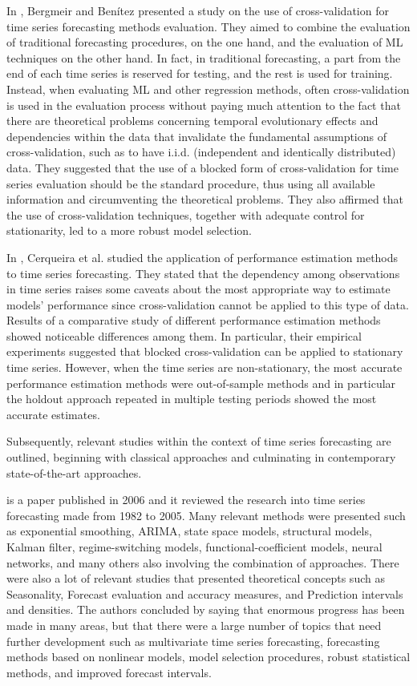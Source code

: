 In \cite{BERGMEIR2012192}, Bergmeir and Benítez presented a study on the use of cross-validation for time series forecasting methods evaluation.
They aimed to combine the evaluation of traditional forecasting procedures, on the one hand, and the evaluation of ML techniques on the other hand.
In fact, in traditional forecasting, a part from the end of each time series is reserved for testing, and the rest is used for training.
Instead, when evaluating ML and other regression methods, often cross-validation is used in the evaluation process without paying much attention to the fact that there are theoretical problems concerning temporal evolutionary effects and dependencies within the data that invalidate the fundamental assumptions of cross-validation, such as to have i.i.d. (independent and identically distributed) data.
They suggested that the use of a blocked form of cross-validation for time series evaluation should be the standard procedure, thus using all available information and circumventing the theoretical problems.
They also affirmed that the use of cross-validation techniques, together with adequate control for stationarity, led to a more robust model selection.

In \cite{Cerqueira2020}, Cerqueira et al. studied the application of performance estimation methods to time series forecasting.
They stated that the dependency among observations in time series raises some caveats about the most appropriate way to estimate models' performance since cross-validation cannot be applied to this type of data.
Results of a comparative study of different performance estimation methods showed noticeable differences among them.
In particular, their empirical experiments suggested that blocked cross-validation can be applied to stationary time series.
However, when the time series are non-stationary, the most accurate performance estimation methods were out-of-sample methods and in particular the holdout approach repeated in multiple testing periods showed the most accurate estimates.

Subsequently, relevant studies within the context of time series forecasting are outlined, beginning with classical approaches and culminating in contemporary state-of-the-art approaches.

\cite{DEGOOIJER2006443} is a paper published in 2006 and it reviewed the research into time series forecasting made from 1982 to 2005.
Many relevant methods were presented such as exponential smoothing, ARIMA, state space models, structural models, Kalman filter, regime-switching models, functional-coefficient models, neural networks, and many others also involving the combination of approaches.
There were also a lot of relevant studies that presented theoretical concepts such as Seasonality, Forecast evaluation and accuracy measures, and Prediction intervals and densities.
The authors concluded by saying that enormous progress has been made in many areas, but that there were a large number of topics that need further development such as multivariate time series forecasting, forecasting methods based on nonlinear models, model selection procedures, robust statistical methods, and improved forecast intervals.

